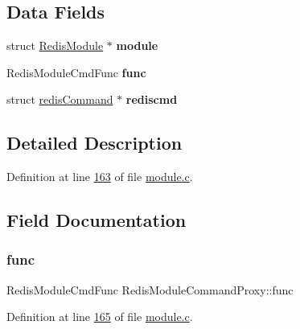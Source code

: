 \subsection*{Data Fields}
\begin{DoxyCompactItemize}
\item 
\mbox{\label{structRedisModuleCommandProxy_ae3e52ba9a8324951e140feaf456d1492}} 
struct \hyperlink{structRedisModule}{Redis\+Module} $\ast$ {\bfseries module}
\item 
\mbox{\label{structRedisModuleCommandProxy_a76770f49f0636715e4325ec2e714d294}} 
Redis\+Module\+Cmd\+Func {\bfseries func}
\item 
\mbox{\label{structRedisModuleCommandProxy_a2cfd4df1e644aadb7a23d50b7f6ab6ef}} 
struct \hyperlink{structredisCommand}{redis\+Command} $\ast$ {\bfseries rediscmd}
\end{DoxyCompactItemize}


\subsection{Detailed Description}


Definition at line \hyperlink{module_8c_source_l00163}{163} of file \hyperlink{module_8c_source}{module.\+c}.



\subsection{Field Documentation}
\mbox{\label{structRedisModuleCommandProxy_a76770f49f0636715e4325ec2e714d294}} 
\subsubsection{\texorpdfstring{func}{func}}
{\footnotesize\ttfamily Redis\+Module\+Cmd\+Func Redis\+Module\+Command\+Proxy\+::func}



Definition at line \hyperlink{module_8c_source_l00165}{165} of file \hyperlink{module_8c_source}{module.\+c}.

